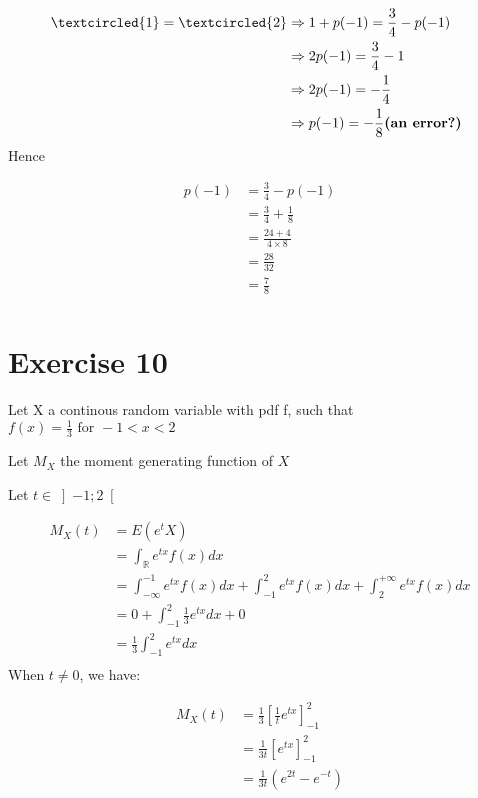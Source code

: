 \documentclass[11pt]{article}
\def\lt{<}
\begin{document}
\begin{align*}
  \textcircled{1} = \textcircled{2} & \Rightarrow  1+p(-1)=\frac{3}{4}-p(-1)\\ 
 			 &\Rightarrow 2p(-1)=\frac{3}{4}-1\\
 			 &\Rightarrow 2p(-1)=-\frac{1}{4}\\  
 			 &\Rightarrow p(-1)=-\frac{1}{8} \textbf{(an error?)        }    
\end{align*}
Hence

\begin{align*}
p(-1)&=\frac{3}{4}-p(-1)\\
	 &=\frac{3}{4}+\frac{1}{8}\\
	 &=\frac{24+4}{4\times 8}\\
	 &=\frac{28}{32}\\
	 &=\frac{7}{8}\\
\end{align*}
  
   
\newpage 
    \section{Exercise 10}
   
   Let X a continous random variable with pdf f, such that $f(x)=\frac{1}{3} \text{ for } -1 \lt x \lt 2$
   
   
   Let $M_X$ the moment generating function of $X$
   
   Let $t \in \left]-1 ; 2\right[
 $
  
  \begin{align*}
M_X(t)&=E(e^tX)\\
	 &=\int_\mathbb{R} e^{tx}f(x)dx\\
	 &=\int_{-\infty}^{-1} e^{tx}f(x)dx+\int_{-1}^2 e^{tx}f(x)dx+\int_{2}^{+\infty} e^{tx}f(x)dx\\
	 &=0+\int_{-1}^2 \frac{1}{3}e^{tx}dx+0\\
	 &=\frac{1}{3}\int_{-1}^2 e^{tx}dx\\
\end{align*}
When $t \neq 0$, we have:

 
  \begin{align*}
M_X(t) &=\frac{1}{3}[\frac{1}{t}e^{tx}]_{-1}^2 \\ 
	  &=\frac{1}{3t}[e^{tx}]_{-1}^2 \\
	  &=\frac{1}{3t}(e^{2t}-e^{-t}) \\
\end{align*}
   
\end{document}

